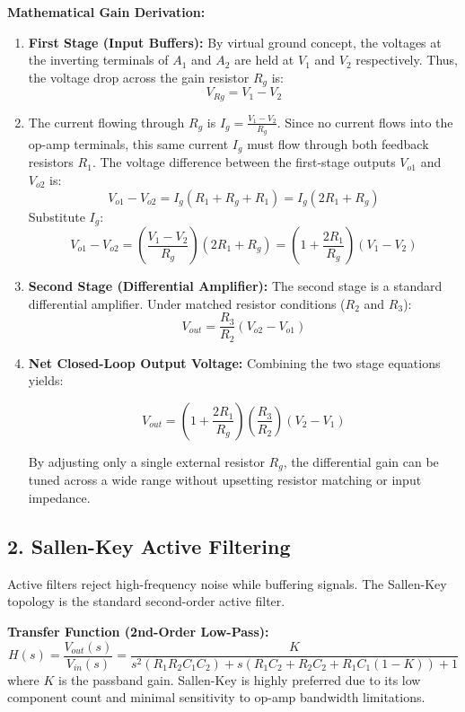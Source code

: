 \documentclass[12pt,a4paper]{article}
\begin{document}
\textbf{Mathematical Gain Derivation:}
\begin{enumerate}[label=\textbf{\arabic*.}, leftmargin=*]
  \item \textbf{First Stage (Input Buffers):} By virtual ground concept, the voltages at the inverting terminals of $A_1$ and $A_2$ are held at $V_1$ and $V_2$ respectively. Thus, the voltage drop across the gain resistor $R_g$ is:
  \[
  V_{Rg} = V_1 - V_2
  \]
  \item The current flowing through $R_g$ is $I_g = \frac{V_1 - V_2}{R_g}$. Since no current flows into the op-amp terminals, this same current $I_g$ must flow through both feedback resistors $R_1$. The voltage difference between the first-stage outputs $V_{o1}$ and $V_{o2}$ is:
  \[
  V_{o1} - V_{o2} = I_g (R_1 + R_g + R_1) = I_g (2R_1 + R_g)
  \]
  Substitute $I_g$:
  \[
  V_{o1} - V_{o2} = \left(\frac{V_1 - V_2}{R_g}\right) (2R_1 + R_g) = \left(1 + \frac{2R_1}{R_g}\right)(V_1 - V_2)
  \]
  \item \textbf{Second Stage (Differential Amplifier):} The second stage is a standard differential amplifier. Under matched resistor conditions ($R_2$ and $R_3$):
  \[
  V_{out} = \frac{R_3}{R_2}(V_{o2} - V_{o1})
  \]
  \item \textbf{Net Closed-Loop Output Voltage:} Combining the two stage equations yields:
  \begin{tcolorbox}[formulabox, title={\textbf{Instrumentation Amplifier Output Gain}}]
  \[
  V_{out} = \left(1 + \frac{2R_1}{R_g}\right)\left(\frac{R_3}{R_2}\right)(V_2 - V_1)
  \]
  \end{tcolorbox}
  By adjusting only a single external resistor $R_g$, the differential gain can be tuned across a wide range without upsetting resistor matching or input impedance.
\end{enumerate}

\subsection{2. Sallen-Key Active Filtering}
Active filters reject high-frequency noise while buffering signals. The Sallen-Key topology is the standard second-order active filter.

\textbf{Transfer Function (2nd-Order Low-Pass):}
\[
H(s) = \frac{V_{out}(s)}{V_{in}(s)} = \frac{K}{s^2(R_1 R_2 C_1 C_2) + s(R_1 C_2 + R_2 C_2 + R_1 C_1(1-K)) + 1}
\]
where $K$ is the passband gain. Sallen-Key is highly preferred due to its low component count and minimal sensitivity to op-amp bandwidth limitations.
\end{document}

